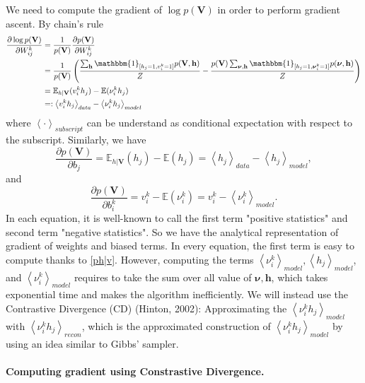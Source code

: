 \documentclass[bj, preprint]{imsart}
\newcommand{\cexp}[1]{\left<#1\right>}
\newcommand{\onebb}{\mathbbm{1}}
\newcommand{\Ebb}{\mathbb{E}}
\begin{document}
We need to compute the gradient of $\log p(\textbf{V})$ in order to perform gradient ascent. By chain's rule
\begin{align*}
\dfrac{\partial \log p(\textbf{V})}{\partial W_{ij}^{k}} &= \dfrac{1}{p(\textbf{V})} \dfrac{\partial p(\textbf{V})}{\partial W_{ij}^{k}} \\
& = \dfrac{1}{p(\textbf{V})} \left(\dfrac{\sum_{\textbf{h}} \onebb_{[h_j = 1, v_{i}^{k} = 1]} p(\textbf{V}, \textbf{h})}{Z} - \dfrac{p(\textbf{V}) \sum_{\boldsymbol{\nu}, \textbf{h}}\onebb_{[h_j = 1, \boldsymbol{\nu}_{i}^{k} = 1]} p(\boldsymbol{\nu}, \textbf{h})}{Z} \right)\\
& = \Ebb_{h|\textbf{V}}(v_i^k h_j) - \Ebb(\nu_i^k h_j)\\
& =: \cexp{v_i^k h_j}_{data} - \cexp{\nu_i^k h_j}_{model}
\end{align*}
where $\cexp{\cdot}_{subscript}$ can be understand as conditional expectation with respect to the subscript. 
Similarly, we have
\begin{equation}
\dfrac{\partial p(\textbf{V})}{\partial b_j}  = \Ebb_{h|\textbf{V}} (h_j) - \Ebb(h_j) =  \cexp{h_j}_{data} - \cexp{h_j}_{model},
\end{equation}
and 
\begin{equation}
\dfrac{\partial p(\textbf{V})}{\partial b_i^k}  = v_i^k - \Ebb(\nu_i^k) = v_i^k - \cexp{\nu_i^k}_{model}.
\end{equation}
In each equation, it is well-known to call the first term "positive statistics" and second term "negative statistics". So we have the analytical representation of gradient of weights and biased terms. In every equation, the first term is easy to compute thanks to \eqref{ph|v}. However, computing the terms $\cexp{\nu_{i}^{k}}_{model}, \cexp{h_j}_{model}$, and $\cexp{\nu_{i}^{k}}_{model}$ requires to take the sum over all value of $\boldsymbol{\nu}, \textbf{h}$, which takes exponential time and makes the algorithm inefficiently. We will instead use the Contrastive Divergence (CD) (Hinton, 2002): Approximating the $\cexp{\nu_i^k h_j}_{model}$ with $\cexp{\nu_i^k h_j}_{recon}$, which  is the approximated construction of $\cexp{\nu_i^k h_j}_{model}$ by using an idea similar to Gibbs' sampler.

\paragraph{Computing gradient using Constrastive Divergence.}\label{par:method.models.rbm.grad}
\end{document}
